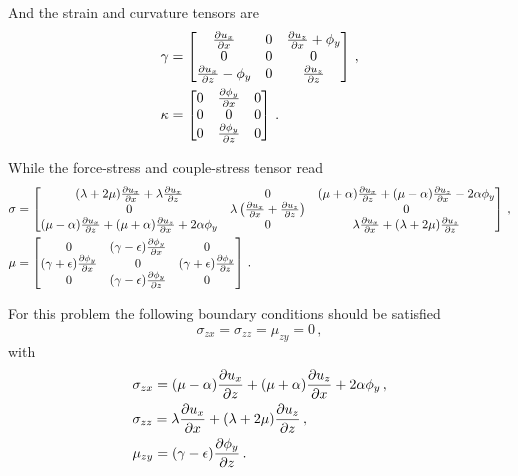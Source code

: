 \documentclass[12pt]{article}
\begin{document}
And the strain and curvature tensors are
\begin{align*}
&\gamma = \begin{bmatrix}
  \pdv{u_x}{x} &0 &\pdv{u_z}{x} + \phi_y\\
  0 & 0 &0\\
  \pdv{u_x}{z} - \phi_y &0 &\pdv{u_z}{z}
\end{bmatrix}\, ,\\
&\kappa = \begin{bmatrix}
  0 &\pdv{\phi_y}{x} &0\\
  0 &0 &0\\
  0 &\pdv{\phi_y}{z} &0
\end{bmatrix}\, .
\end{align*}

While the force-stress and  couple-stress tensor read
\begin{align*}
&\sigma = \begin{bmatrix}
  (\lambda + 2\mu)\pdv{u_x}{x} + \lambda \pdv{u_x}{z} &0 &(\mu + \alpha)\pdv{u_x}{z} + (\mu - \alpha)\pdv{u_z}{x} - 2\alpha \phi_y\\
  0 &\lambda\left(\pdv{u_x}{x} + \pdv{u_z}{z}\right) & 0\\
  (\mu - \alpha)\pdv{u_x}{z} + (\mu + \alpha)\pdv{u_z}{x} + 2\alpha \phi_y &0 &\lambda\pdv{u_x}{x} + (\lambda + 2\mu)\pdv{u_z}{z}
\end{bmatrix}\, ,\\
&\mu = \begin{bmatrix}
  0 &(\gamma - \epsilon)\pdv{\phi_y}{x} &0\\
  (\gamma + \epsilon)\pdv{\phi_y}{x} &0 &(\gamma + \epsilon)\pdv{\phi_y}{z}\\
  0 &(\gamma - \epsilon)\pdv{\phi_y}{z} &0
\end{bmatrix}\, .
\end{align*}

For this problem the following boundary conditions should be satisfied
\[\sigma_{zx} = \sigma_{zz} = \mu_{zy} = 0\, ,\]
with
\begin{align*}
&\sigma_{zx} = (\mu - \alpha)\pdv{u_x}{z} + (\mu + \alpha)\pdv{u_z}{x} + 2\alpha \phi_y\, ,\\
&\sigma_{zz} = \lambda\pdv{u_x}{x} + (\lambda + 2\mu)\pdv{u_z}{z}\, ,\\
&\mu_{zy} = (\gamma - \epsilon)\pdv{\phi_y}{z}\, .
\end{align*}
\end{document}
